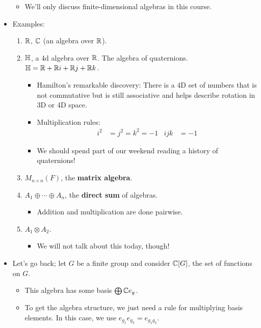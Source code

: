 \documentclass[../notes.tex]{subfiles}
\begin{document}
\begin{itemize}
    \begin{itemize}
        \item We'll only discuss finite-dimensional algebras in this course.
    \end{itemize}
    \item Examples:
    \begin{enumerate}
        \item $\mathbb{R}$, $\mathbb{C}$ (an algebra over $\mathbb{R}$).
        \item $\mathbb{H}$, a 4d algebra over $\mathbb{R}$. The algebra of quaternions. $\mathbb{H}=\mathbb{R}+\mathbb{R} i+\mathbb{R} j+\mathbb{R} k$.
        \begin{itemize}
            \item Hamilton's remarkable discovery: There is a 4D set of numbers that is not commutative but is still associative and helps describe rotation in 3D or 4D space.
            \item Multiplication rules:
            \begin{align*}
                i^2 &= j^2 = k^2 = -1&
                ijk &= -1
            \end{align*}
            \item We should spend part of our weekend reading a history of quaternions!
        \end{itemize}
        \item $M_{n\times n}(F)$, the \textbf{matrix algebra}.
        \item $A_1\oplus\cdots\oplus A_n$, the \textbf{direct sum} of algebras.
        \begin{itemize}
            \item Addition and multiplication are done pairwise.
        \end{itemize}
        \item $A_1\otimes A_2$.
        \begin{itemize}
            \item We will not talk about this today, though!
        \end{itemize}
    \end{enumerate}
    \item Let's go back; let $G$ be a finite group and consider $\mathbb{C}[G]$, the set of functions on $G$.
    \begin{itemize}
        \item This algebra has some basis $\bigoplus\mathbb{C} e_g$.
        \item To get the algebra structure, we just need a rule for multiplying basis elements. In this case, we use $e_{g_1}e_{g_2}=e_{g_1g_2}$.

\end{itemize}
\end{itemize}
\end{document}
